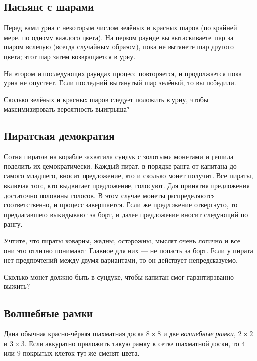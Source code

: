 \subsection*{Пасьянс с шарами}

Перед вами урна с некоторым числом зелёных и красных шаров (по крайней мере, по одному каждого цвета).
На первом раунде вы вытаскиваете шар за шаром вслепую (всегда случайным образом), пока не вытянете шар другого цвета; этот шар затем возвращается в урну.

На втором и последующих раундах процесс повторяется, и продолжается пока урна не опустеет.
Если последний вытянутый шар зелёный, то вы победили.

Сколько зелёных и красных шаров следует положить в урну, чтобы максимизировать вероятность выигрыша?

\subsection*{Пиратская демократия}

Сотня пиратов на корабле захватила сундук с золотыми монетами и решила поделить их демократически.
Каждый пират, в порядке ранга от капитана до самого младшего, вносит предложение, кто и сколько монет получит.
Все пираты, включая того, кто выдвигает предложение, голосуют.
Для принятия предложения достаточно половины голосов.
В этом случае монеты распределяются соответственно, и процесс завершается.
Если же предложение отвергнуто, то предлагавшего выкидывают за борт, и далее предложение вносит следующий по рангу.

Учтите, что пираты коварны, жадны, осторожны, мыслят очень логично и все они это отлично понимают.
Главное для них --- не попасть за борт.
Если у пирата нет предпочтений между двумя вариантами, то он действует непредсказуемо.

Сколько монет должно быть в сундуке, чтобы капитан смог гарантированно выжить?

\subsection*{Волшебные рамки}

Дана обычная красно-чёрная шахматная доска $8 \times 8$ и две \emph{волшебные рамки},  $2 \times 2$ и $3 \times 3$.
Если аккуратно приложить такую рамку к сетке шахматной доски, то $4$ или $9$ покрытых клеток тут же сменят цвета.

